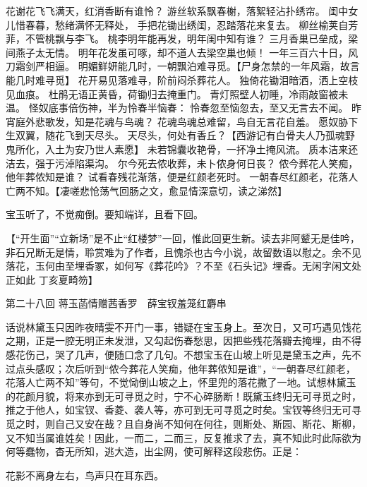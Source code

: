\documentclass[12pt,oneside]{book}
\begin{document}
花谢花飞飞满天，红消香断有谁怜？
游丝软系飘春榭，落絮轻沾扑绣帘。
闺中女儿惜春暮，愁绪满怀无释处，
手把花锄出绣闺，忍踏落花来复去。
柳丝榆荚自芳菲，不管桃飘与李飞。
桃李明年能再发，明年闺中知有谁？
三月香巢已垒成，梁间燕子太无情。
明年花发虽可啄，却不道人去梁空巢也倾！
一年三百六十日，风刀霜剑严相逼。
明媚鲜妍能几时，一朝飘泊难寻觅。【尸身怎禁的一年风霜，故言能几时难寻觅】
花开易见落难寻，阶前闷杀葬花人。
独倚花锄泪暗洒，洒上空枝见血痕。
杜鹃无语正黄昏，荷锄归去掩重门。
青灯照壁人初睡，冷雨敲窗被未温。
怪奴底事倍伤神，半为怜春半恼春：
怜春忽至恼忽去，至又无言去不闻。
昨宵庭外悲歌发，知是花魂与鸟魂？
花魂鸟魂总难留，鸟自无言花自羞。
愿奴胁下生双翼，随花飞到天尽头。
天尽头，何处有香丘？【西游记有白骨夫人乃孤魂野鬼所化，入土为安乃世人素愿】
未若锦囊收艳骨，一抔净土掩风流。
质本洁来还洁去，强于污淖陷渠沟。
尔今死去侬收葬，未卜侬身何日丧？
侬今葬花人笑痴，他年葬侬知是谁？
试看春残花渐落，便是红颜老死时。
一朝春尽红颜老，花落人亡两不知。【凄嗟悲怆荡气回肠之文，愈显情深意切，读之涕然】

宝玉听了，不觉痴倒。要知端详，且看下回。

【“开生面”“立新场”是不止“红楼梦”一回，惟此回更生新。读去非阿颦无是佳吟，非石兄断无是情，聆赏难为了作者，且愧杀也古今小说，故留数语以慰之。余不见落花，玉何由至埋香冢，如何写《葬花吟》？不至《石头记》埋香。无闲字闲文处正如此
丁亥夏畸笏】
 
第二十八回  蒋玉菡情赠茜香罗　薛宝钗羞笼红麝串


话说林黛玉只因昨夜晴雯不开门一事，错疑在宝玉身上。至次日，又可巧遇见饯花之期，正是一腔无明正未发泄，又勾起伤春愁思，因把些残花落瓣去掩埋，由不得感花伤己，哭了几声，便随口念了几句。不想宝玉在山坡上听见是黛玉之声，先不过点头感叹；次后听到“侬今葬花人笑痴，他年葬侬知是谁”，“一朝春尽红颜老，花落人亡两不知”等句，不觉恸倒山坡之上，怀里兜的落花撒了一地。试想林黛玉的花颜月貌，将来亦到无可寻觅之时，宁不心碎肠断！既黛玉终归无可寻觅之时，推之于他人，如宝钗、香菱、袭人等，亦可到无可寻觅之时矣。宝钗等终归无可寻觅之时，则自己又安在哉？且自身尚不知何在何往，则斯处、斯园、斯花、斯柳，又不知当属谁姓矣！因此，一而二，二而三，反复推求了去，真不知此时此际欲为何等蠢物，杳无所知，逃大造，出尘网，使可解释这段悲伤。正是：

花影不离身左右，鸟声只在耳东西。
\end{document}
